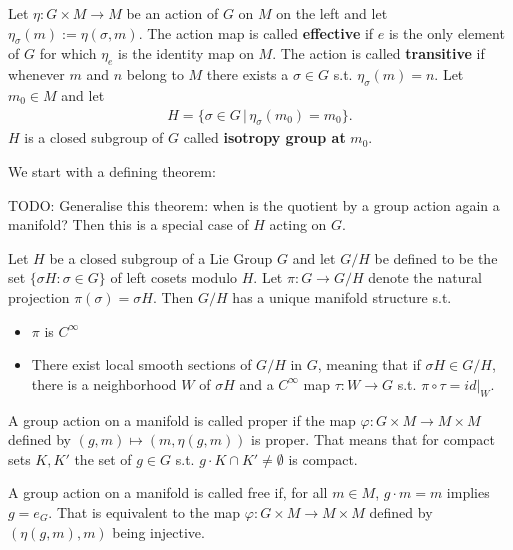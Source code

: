 \begin{definition}
\textup{\cite[3.61]{Warner1983}}
Let $\eta \colon G \times M \to M$ be an action of $G$ on $M$ on the left and let $\eta_{\sigma}(m) := \eta(\sigma,m)$. The action map is called \textbf{effective} if $e$ is the only element of $G$ for which $\eta_e$ is the identity map on $M$. The action is called \textbf{transitive} if whenever $m$ and $n$ belong to $M$ there exists a $\sigma \in G$ s.t. $\eta_{\sigma}(m) = n$. Let $m_0 \in M$ and let 
\begin{align*}
H = \{\sigma \in G \, \vert \, \eta_{\sigma}(m_0) = m_0\}.
\end{align*}
$H$ is a closed subgroup of $G$ called \textbf{isotropy group at} $m_0$.
\end{definition}

We start with a defining theorem:
\begin{theorem}\label{Thm:homogeneous}
\textup{\cite[3.58]{Warner1983}}
TODO: Generalise this theorem: when is the quotient by a group action again a manifold? Then this is a special case of $H$ acting on $G$.

Let $H$ be a closed subgroup of a Lie Group $G$ and let $G/H$ be defined to be the set $\{\sigma H \colon \sigma \in G\}$ of left cosets modulo $H$. Let $\pi \colon G \to G/H$ denote the natural projection $\pi(\sigma) = \sigma H$. Then $G/H$ has a unique manifold structure s.t.
\begin{itemize}
\item $\pi$ is $C^{\infty}$
\item There exist local smooth sections of $G/H$ in $G$, meaning that if $\sigma H \in G/H$, there is a neighborhood $W$ of $\sigma H$ and a $C^{\infty}$ map $\tau \colon W \to G$ s.t. $\pi \circ \tau = id\vert_W$.
\end{itemize}
\end{theorem}
\begin{definition}
A group action on a manifold is called proper if the map $\varphi \colon G \times M \to M \times M$ defined by $(g,m) \mapsto (m, \eta(g,m))$ is proper. That means that for compact sets $K,K'$ the set of $g \in G$ s.t. $g \cdot K \cap K' \neq \emptyset$ is compact. 
\end{definition}
\begin{definition}
A group action on a manifold is called free if, for all $m \in M$, $g \cdot m = m$ implies $g = e_G$. That is equivalent to the map $\varphi \colon G \times M \to M \times M$ defined by $(\eta(g,m),m)$ being injective.
\end{definition}
